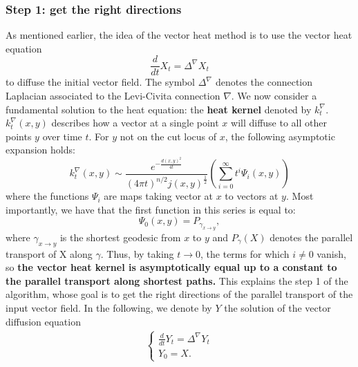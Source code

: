 \documentclass[sigconf]{acmart}
\begin{document}
\subsubsection{Step 1: get the right directions}
As mentioned earlier, the idea of the vector heat method is to use the vector heat equation 
\begin{equation} \label{eq:vector-heat}
  \frac{d}{dt} X_t = \Delta^\nabla X_t
  \end{equation}
to diffuse the initial vector field. The symbol $\Delta^\nabla$ denotes the connection Laplacian associated to the Levi-Civita connection $\nabla$. 
We now consider a fundamental solution to the heat equation: the \textbf{heat kernel} denoted by $k_t^\nabla$. $k_t^\nabla(x,y)$ describes how 
a vector at a single point $x$ will diffuse to all other points $y$ over time $t$. For $y$ not on the cut locus of $x$, the following asymptotic
expansion holds:
\begin{equation} \label{eq:asymptotic_expansion}
  k_t^\nabla(x, y) \sim \frac{e^{-\frac{d(x, y)^2}{4t}}}{(4 \pi t)^{n/2} j(x, y)^\frac{1}{2}} 
\left( \sum_{i=0}^{\infty} t^i \Psi_i(x, y) \right)
  \end{equation}
where the functions $\Psi_i$ are maps taking vector at $x$ to vectors at $y$. Most importantly, we have that the first function in this series 
is equal to:
$$\Psi_0(x,y) = P_{\gamma_{x\rightarrow y}}, $$ where $\gamma_{x \rightarrow y}$ is the shortest geodesic from $x$ to $y$ and $P_\gamma(X)$
denotes the parallel transport of X along $\gamma$. Thus, by taking $t\rightarrow 0$, the terms for which $i\neq 0$ vanish, so \textbf{the vector heat 
kernel is asymptotically equal up to a constant to the parallel transport along shortest paths.} This explains the step 1 of the algorithm, whose goal 
is to get the right directions of the parallel transport of the input vector field. In the following, we denote by $Y$ the solution of the 
vector diffusion equation 
\begin{align*}
  \begin{cases}
  \frac{d}{dt}Y_t  = \Delta^\nabla Y_t \\
  Y_0  = X.
\end{cases}
\end{align*}
\end{document}
